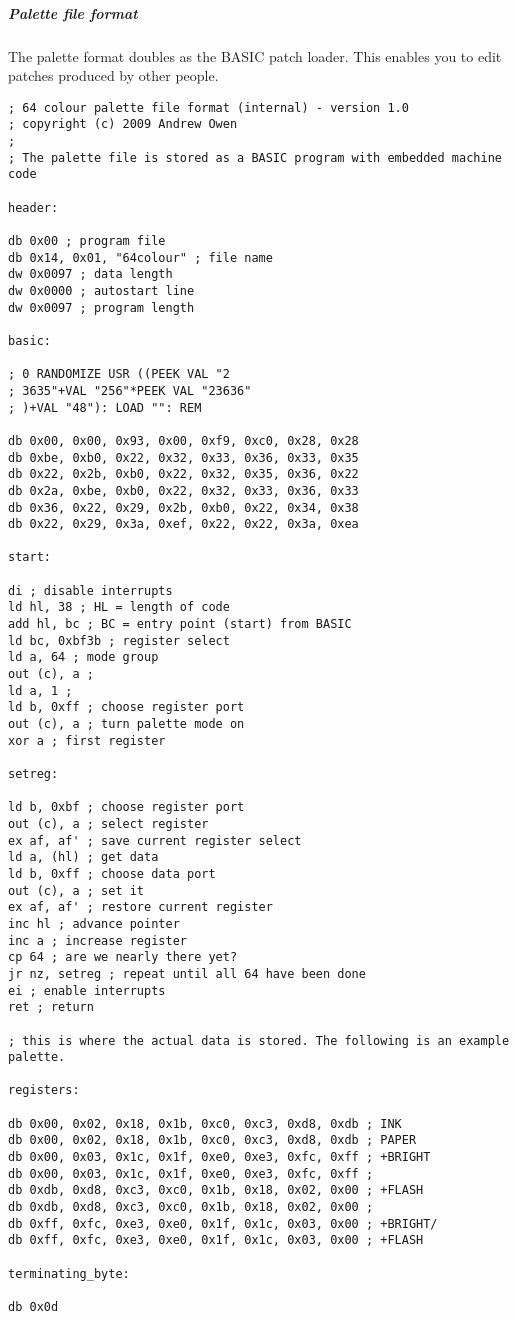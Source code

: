 \subparagraph{Palette file format}
The palette format doubles as the BASIC patch loader. This enables you
to edit patches produced by other people.
\sinset
\begin{verbatim}
; 64 colour palette file format (internal) - version 1.0
; copyright (c) 2009 Andrew Owen
;
; The palette file is stored as a BASIC program with embedded machine code

header:

db 0x00 ; program file
db 0x14, 0x01, "64colour" ; file name
dw 0x0097 ; data length
dw 0x0000 ; autostart line
dw 0x0097 ; program length

basic:

; 0 RANDOMIZE USR ((PEEK VAL "2
; 3635"+VAL "256"*PEEK VAL "23636"
; )+VAL "48"): LOAD "": REM

db 0x00, 0x00, 0x93, 0x00, 0xf9, 0xc0, 0x28, 0x28
db 0xbe, 0xb0, 0x22, 0x32, 0x33, 0x36, 0x33, 0x35
db 0x22, 0x2b, 0xb0, 0x22, 0x32, 0x35, 0x36, 0x22
db 0x2a, 0xbe, 0xb0, 0x22, 0x32, 0x33, 0x36, 0x33
db 0x36, 0x22, 0x29, 0x2b, 0xb0, 0x22, 0x34, 0x38
db 0x22, 0x29, 0x3a, 0xef, 0x22, 0x22, 0x3a, 0xea

start:

di ; disable interrupts
ld hl, 38 ; HL = length of code
add hl, bc ; BC = entry point (start) from BASIC
ld bc, 0xbf3b ; register select
ld a, 64 ; mode group
out (c), a ;
ld a, 1 ;
ld b, 0xff ; choose register port
out (c), a ; turn palette mode on
xor a ; first register

setreg:

ld b, 0xbf ; choose register port
out (c), a ; select register
ex af, af' ; save current register select
ld a, (hl) ; get data
ld b, 0xff ; choose data port
out (c), a ; set it
ex af, af' ; restore current register
inc hl ; advance pointer
inc a ; increase register
cp 64 ; are we nearly there yet?
jr nz, setreg ; repeat until all 64 have been done
ei ; enable interrupts
ret ; return

; this is where the actual data is stored. The following is an example palette.

registers:

db 0x00, 0x02, 0x18, 0x1b, 0xc0, 0xc3, 0xd8, 0xdb ; INK
db 0x00, 0x02, 0x18, 0x1b, 0xc0, 0xc3, 0xd8, 0xdb ; PAPER
db 0x00, 0x03, 0x1c, 0x1f, 0xe0, 0xe3, 0xfc, 0xff ; +BRIGHT
db 0x00, 0x03, 0x1c, 0x1f, 0xe0, 0xe3, 0xfc, 0xff ;
db 0xdb, 0xd8, 0xc3, 0xc0, 0x1b, 0x18, 0x02, 0x00 ; +FLASH
db 0xdb, 0xd8, 0xc3, 0xc0, 0x1b, 0x18, 0x02, 0x00 ;
db 0xff, 0xfc, 0xe3, 0xe0, 0x1f, 0x1c, 0x03, 0x00 ; +BRIGHT/
db 0xff, 0xfc, 0xe3, 0xe0, 0x1f, 0x1c, 0x03, 0x00 ; +FLASH

terminating_byte:

db 0x0d 
\end{verbatim}
\einset
